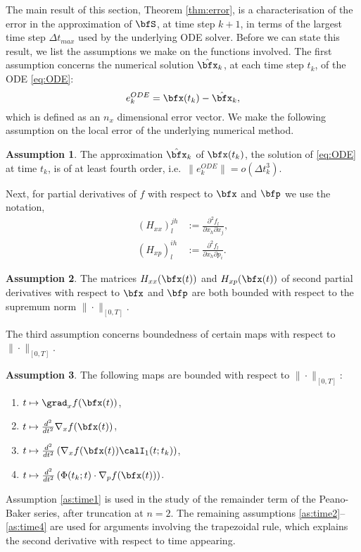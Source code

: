 \documentclass[DIV=12]{scrartcl} %
\newcommand{\err}{\ensuremath{e}}
\theoremstyle{definition}
\newtheorem{assumption}{Assumption}
\begin{document}
The main result of this section, Theorem \ref{thm:error}, is a characterisation of the error in the approximation of $\bfS$, at time step $k+1$, in terms of the largest time step $\Delta t _{max}$ used by the underlying ODE solver. Before we can state this result, we list the assumptions we make on the functions involved. The first assumption concerns the numerical solution $\hat{\bfx}_k$, at each time step $t_k$, of the ODE \eqref{eq:ODE}:
\[
    \err^{ODE}_{k} = \bfx(t_k)-\hat{\bfx}_k,
\]
 which is defined as an $n_x$ dimensional error vector. We make the following assumption on the local error of the underlying numerical method. 
\begin{assumption}
\label{as:errorODE}
The approximation $\hat \bfx _k$ of $\bfx (t_k)$, the solution of \eqref{eq:ODE} at time $t_k$, is of at least fourth order, i.e.\ $\|\err^{ODE}_{k}\|=o(\Delta t_k^3)$. 
\end{assumption}
Next, for partial derivatives of $f$ with respect to $\bfx$ and $\bfp$ we use the notation,
\begin{align*}
    \left(H_{xx}\right)^{jh}_l &:=\frac{\partial^2 f_l}{\partial x_h\partial x_j}, \\
    \left(H_{xp}\right)^{ih}_l &:=\frac{\partial^2 f_l}{\partial x_h\partial p_i}.
\end{align*}
\begin{assumption}
\label{as:boundedH}
    The matrices $H_{xx}(\bfx (t))$ and $H_{xp} (\bfx (t))$ of second partial derivatives with respect to $\bfx$ and $\bfp$ are both bounded with respect to the supremum norm $\| \cdot \|_{[0,T]}$.
\end{assumption}
The third assumption concerns boundedness of certain maps with respect to $\| \cdot \| _{[0,T]}$.
\begin{assumption}
\label{as:time}
The following maps are bounded with respect to $\| \cdot \| _{[0,T]}$:
\begin{enumerate}[label=(\ref{as:time}.\arabic*)]
    \item\label{as:time1} $t \mapsto \grad _x f(\bfx (t))$,
    \item\label{as:time2} $t\mapsto\frac{d^2}{dt^2}\nabla_xf(\bfx(t))$,
    \item\label{as:time3} $t\mapsto\frac{d^2}{dt^2}\left(\nabla_xf(\bfx(t))\calI_1(t;t_k)\right)$,
    \item\label{as:time4} $t\mapsto\frac{d^2}{dt^2}\left(\Phi(t_k;t)\cdot\nabla_pf(\bfx(t))\right)$.
\end{enumerate}
\end{assumption}
Assumption \ref{as:time1} is used in the study of the remainder term of the Peano-Baker series, after truncation at $n=2$. The remaining assumptions \ref{as:time2}–\ref{as:time4} are used for arguments involving the trapezoidal rule, which explains the second derivative with respect to time appearing.
\end{document}
